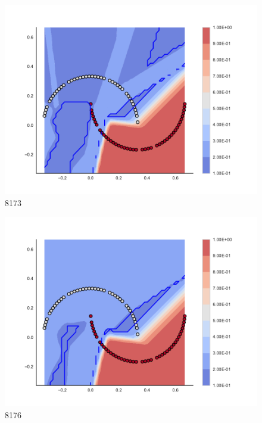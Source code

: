 \begin{subfigure}[b]{0.09\textwidth}
    \includegraphics[clip, trim=2.35cm 1.75cm 4.5cm 0cm,width=\textwidth]{img/convergence/8173.pdf}
    \caption{8173}
    \label{fig:convergence_8173}
\end{subfigure}
%
\begin{subfigure}[b]{0.09\textwidth}
    \includegraphics[clip, trim=2.35cm 1.75cm 4.5cm 0cm,width=\textwidth]{img/convergence/8176.pdf}
    \caption{8176}
    \label{fig:convergence_8176}
\end{subfigure}
%
